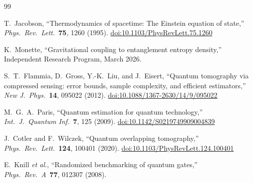 \documentclass[12pt,letterpaper]{article}
\theoremstyle{plain}
\theoremstyle{definition}
\begin{document}

\begin{thebibliography}{99}

T.~Jacobson,
``Thermodynamics of spacetime: The Einstein equation of state,''
\textit{Phys.\ Rev.\ Lett.}\ \textbf{75}, 1260 (1995).
\href{https://doi.org/10.1103/PhysRevLett.75.1260}{doi:10.1103/PhysRevLett.75.1260}

K.~Monette,
``Gravitational coupling to entanglement entropy density,''
Independent Research Program, March 2026.

S.~T.~Flammia, D.~Gross, Y.-K.~Liu, and J.~Eisert,
``Quantum tomography via compressed sensing: error bounds, sample complexity, and
efficient estimators,''
\textit{New J.\ Phys.}\ \textbf{14}, 095022 (2012).
\href{https://doi.org/10.1088/1367-2630/14/9/095022}{doi:10.1088/1367-2630/14/9/095022}

M.~G.~A.~Paris,
``Quantum estimation for quantum technology,''
\textit{Int.\ J.\ Quantum Inf.}\ \textbf{7}, 125 (2009).
\href{https://doi.org/10.1142/S0219749909004839}{doi:10.1142/S0219749909004839}

J.~Cotler and F.~Wilczek,
``Quantum overlapping tomography,''
\textit{Phys.\ Rev.\ Lett.}\ \textbf{124}, 100401 (2020).
\href{https://doi.org/10.1103/PhysRevLett.124.100401}{doi:10.1103/PhysRevLett.124.100401}

E.~Knill \textit{et al.},
``Randomized benchmarking of quantum gates,''
\textit{Phys.\ Rev.\ A}\ \textbf{77}, 012307 (2008).

\end{thebibliography}
\end{document}
